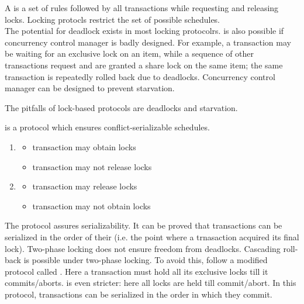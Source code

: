 \documentclass{article}
\begin{document}
A  is a set of rules followed by all transactions while requesting and releasing locks. Locking protocls restrict the set of possible schedules. \\ 

The potential for deadlock exists in most locking protocolrs.  is also possible if concurrency control manager is badly designed. For example, a transaction may be waiting for an exclusive lock on an item, while a sequence of other transactions request and are granted a share lock on the same item; the same transaction is repeatedly rolled back due to deadlocks. Concurrency control manager can be designed to prevent starvation. 

\begin{remark}
  The pitfalls of lock-based protocols are deadlocks and starvation. 
\end{remark}

 is a protocol which ensures conflict-serializable schedules. 
\begin{enumerate}
  \item {}
  \begin{itemize}
    \item transaction may obtain locks 
    \item transaction may not release locks
  \end{itemize}
  \item {}
  \begin{itemize}
    \item transaction may release locks 
    \item transaction may not obtain locks
  \end{itemize}
\end{enumerate}
The protocol assures serializability. It can be proved that transactions can be serialized in the order of their  (i.e. the point where a trnasaction acquired its final lock). Two-phase locking does not ensure freedom from deadlocks. Cascading roll-back is possible under two-phase locking. To avoid this, follow a modified protocol called . Here a transaction must hold all its exclusive locks till it commits/aborts.  is even stricter: here all locks are held till commit/abort. In this protocol, transactions can be serialized in the order in which they commit. \\ 
\end{document}
